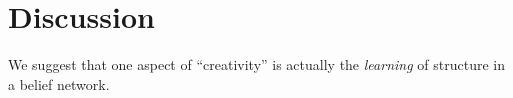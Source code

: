 \section{Discussion}

We suggest that one aspect of ``creativity'' is actually the {\em learning} of structure in a belief network.